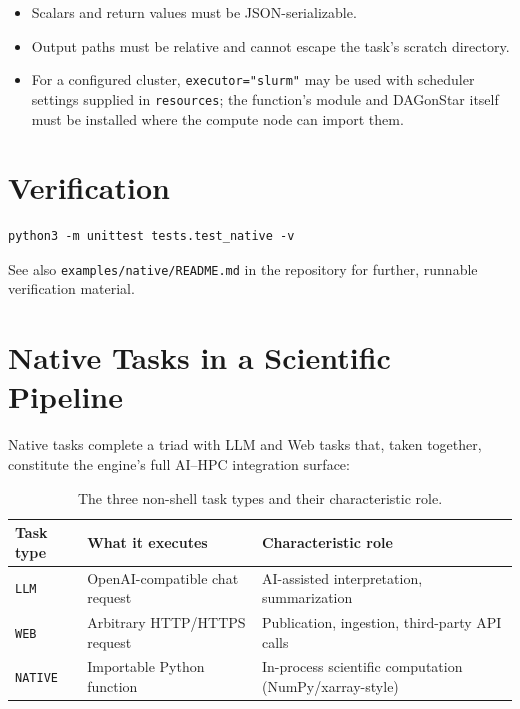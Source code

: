 \begin{itemize}[leftmargin=1.4em]
  \item Scalars and return values must be JSON-serializable.
  \item Output paths must be relative and cannot escape the task's scratch
    directory.
  \item For a configured cluster, \texttt{executor="slurm"} may be used with
    scheduler settings supplied in \texttt{resources}; the function's module
    and DAGonStar itself must be installed where the compute node can import
    them.
\end{itemize}

\section{Verification}

\begin{lstlisting}[style=bash]
python3 -m unittest tests.test_native -v
\end{lstlisting}

See also \texttt{examples/native/README.md} in the repository for further,
runnable verification material.

\section{Native Tasks in a Scientific Pipeline}

Native tasks complete a triad with LLM and Web tasks that, taken together,
constitute the engine's full AI--HPC integration surface:

\begin{table}[h]
\centering
\caption{The three non-shell task types and their characteristic role.}
\label{tab:ai-hpc-triad}
\begin{tabular}{@{}lll@{}}
\toprule
\textbf{Task type} & \textbf{What it executes} & \textbf{Characteristic role} \\
\midrule
\texttt{LLM}    & OpenAI-compatible chat request & AI-assisted interpretation, summarization \\
\texttt{WEB}    & Arbitrary HTTP/HTTPS request   & Publication, ingestion, third-party API calls \\
\texttt{NATIVE} & Importable Python function     & In-process scientific computation (NumPy/xarray-style) \\
\bottomrule
\end{tabular}
\end{table}

